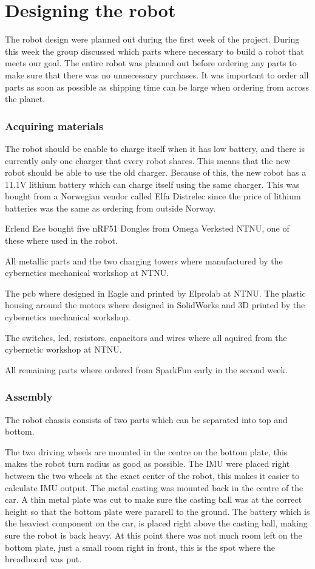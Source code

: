 \section{Designing the robot}
The robot design were planned out during the first week of the project. During this week the group discussed which parts where necessary to build a robot that meets our goal. The entire robot was planned out before ordering any parts to make sure that there was no unnecessary purchases. It was important to order all parts as soon as possible as shipping time can be large when ordering from across the planet.

\subsubsection{Acquiring materials}
The robot should be enable to charge itself when it has low battery, and there is currently only one charger that every robot shares. This means that the new robot should be able to use the old charger. Because of this, the new robot has a 11.1V lithium battery which can charge itself using the same charger. This was bought from a Norwegian vendor called Elfa Distrelec\cite{elfa} since the price of lithium batteries was the same as ordering from outside Norway.

Erlend Ese bought five nRF51 Dongles from Omega Verksted NTNU, one of these where used in the robot.

All metallic parts and the two charging towers where manufactured by the cybernetics mechanical workshop at NTNU.

The \acrshort{pcb} where designed in Eagle and printed by Elprolab\cite{elprolab} at NTNU. The plastic housing around the motors where designed in SolidWorks and 3D printed by the cybernetics mechanical workshop.

The switches, \acrfull{led}, resistors, capacitors and wires where all aquired from the cybernetic workshop at NTNU.

All remaining parts where ordered from SparkFun early in the second week.


\subsubsection{Assembly}
The robot chassis consists of two parts which can be separated into top and bottom.

The two driving wheels are mounted in the centre on the bottom plate, this makes the robot turn radius as good as possible. The IMU were placed right between the two wheels at the exact center of the robot, this makes it easier to calculate IMU output. The metal casting was mounted back in the centre of the car. A thin metal plate was cut to make sure the casting ball was at the correct height so that the bottom plate were pararell to the ground. The battery which is the heaviest component on the car, is placed right above the casting ball, making sure the robot is back heavy. At this point there was not much room left on the bottom plate, just a small room right in front, this is the spot where the breadboard was put.

